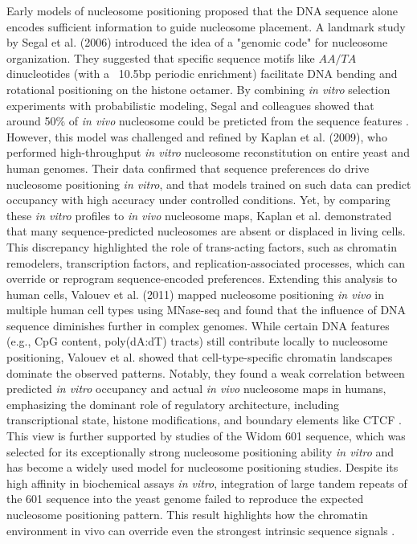 \documentclass[11pt]{book}
\begin{document}
Early models of nucleosome positioning proposed that the DNA sequence alone encodes sufficient information to guide nucleosome placement. A landmark study by Segal et al. (2006) introduced the idea of a "genomic code" for nucleosome organization. They suggested that specific sequence motifs like $AA/TA$ dinucleotides (with a \string~10.5bp periodic enrichment) facilitate DNA bending and rotational positioning on the histone octamer. By combining \textit{in vitro} selection experiments with probabilistic modeling, Segal and colleagues showed that around 50\% of \textit{in vivo} nucleosome could be preticted from the sequence features \cite{segal_genomic_2006}.
However, this model was challenged and refined by Kaplan et al. (2009), who performed high-throughput \textit{in vitro} nucleosome reconstitution on entire yeast and human genomes. Their data confirmed that sequence preferences do drive nucleosome positioning \textit{in vitro}, and that models trained on such data can predict occupancy with high accuracy under controlled conditions. Yet, by comparing these \textit{in vitro} profiles to \textit{in vivo} nucleosome maps, Kaplan et al. demonstrated that many sequence-predicted nucleosomes are absent or displaced in living cells. This discrepancy highlighted the role of trans-acting factors, such as chromatin remodelers, transcription factors, and replication-associated processes, which can override or reprogram sequence-encoded preferences\cite{kaplanDNAencodedNucleosomeOrganization2009}.
Extending this analysis to human cells, Valouev et al. (2011) mapped nucleosome positioning \textit{in vivo} in multiple human cell types using MNase-seq and found that the influence of DNA sequence diminishes further in complex genomes. While certain DNA features (e.g., CpG content, poly(dA:dT) tracts) still contribute locally to nucleosome positioning, Valouev et al. showed that cell-type-specific chromatin landscapes dominate the observed patterns. Notably, they found a weak correlation between predicted \textit{in vitro} occupancy and actual \textit{in vivo} nucleosome maps in humans, emphasizing the dominant role of regulatory architecture, including transcriptional state, histone modifications, and boundary elements like CTCF \cite{valouev_determinants_2011}.
This view is further supported by studies of the Widom 601 sequence, which was selected for its exceptionally strong nucleosome positioning ability \textit{in vitro} \cite{lowary_new_1998} and has become a widely used model for nucleosome positioning studies. Despite its high affinity in biochemical assays \textit{in vitro}, integration of large tandem repeats of the 601 sequence into the yeast genome failed to reproduce the expected nucleosome positioning pattern. This result highlights how the chromatin environment in vivo can override even the strongest intrinsic sequence signals \cite{lancrey_nucleosome_2022}.
\end{document}
